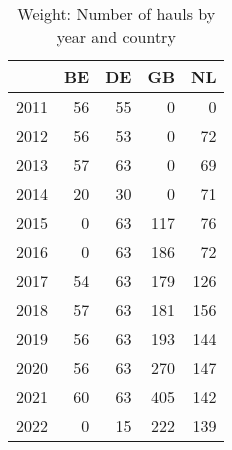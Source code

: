 \begin{table}[ht]
\centering
\begin{tabular}{rrrrr}
  \hline
 & BE & DE & GB & NL \\ 
  \hline
2011 & 56 & 55 & 0 & 0 \\ 
  2012 & 56 & 53 & 0 & 72 \\ 
  2013 & 57 & 63 & 0 & 69 \\ 
  2014 & 20 & 30 & 0 & 71 \\ 
  2015 & 0 & 63 & 117 & 76 \\ 
  2016 & 0 & 63 & 186 & 72 \\ 
  2017 & 54 & 63 & 179 & 126 \\ 
  2018 & 57 & 63 & 181 & 156 \\ 
  2019 & 56 & 63 & 193 & 144 \\ 
  2020 & 56 & 63 & 270 & 147 \\ 
  2021 & 60 & 63 & 405 & 142 \\ 
  2022 & 0 & 15 & 222 & 139 \\ 
   \hline
\end{tabular}
\caption{Weight: Number of hauls by year and country} 
\end{table}

